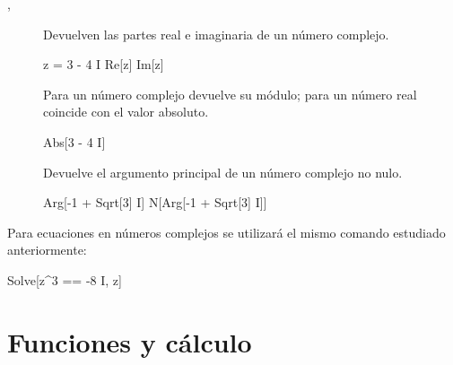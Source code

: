 \begin{description}

\item[, ] Devuelven las partes real e imaginaria de un número complejo.
\begin{mathematicacode}
z = 3 - 4 I
Re[z]
Im[z]
\end{mathematicacode}

\item[] Para un número complejo devuelve su módulo; para un número real coincide con el valor absoluto.
\begin{mathematicacode}
Abs[3 - 4 I]
\end{mathematicacode}

\item[] Devuelve el argumento principal de un número complejo no nulo.
\begin{mathematicacode}
Arg[-1 + Sqrt[3] I]
N[Arg[-1 + Sqrt[3] I]]
\end{mathematicacode}

\end{description}

Para ecuaciones en números complejos se utilizará el mismo comando  estudiado anteriormente:
\begin{mathematicacode}
Solve[z^3 == -8 I, z]
\end{mathematicacode}

\section*{Funciones y cálculo}

